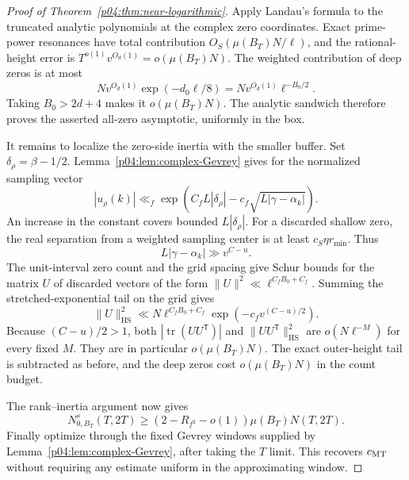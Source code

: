 \documentclass[11pt,letterpaper]{article}
\theoremstyle{definition}
\theoremstyle{remark}
\DeclareMathOperator{\tr}{tr}
\newcommand{\1}{\mathbf 1}
\begin{document}
\begin{proof}[Proof of Theorem~\ref{p04:thm:near-logarithmic}]
Apply Landau's formula to the truncated analytic polynomials at
the complex zero coordinates. Exact prime-power resonances have
total contribution $O_S(\mu(B_T)N/\ell)$, and the rational-height
error is $T^{o(1)}v^{O_d(1)}=o(\mu(B_T)N)$. The weighted
contribution of deep zeros is at most
\[
 Nv^{O_d(1)}\exp(-d_0\ell/8)
       =Nv^{O_d(1)}\ell^{-B_0/2}.
\]
Taking $B_0>2d+4$ makes it $o(\mu(B_T)N)$. The analytic
sandwich therefore proves the asserted all-zero asymptotic,
uniformly in the box.

It remains to localize the zero-side inertia with the smaller
buffer. Set $\delta_\rho=\beta-1/2$. Lemma~\ref{p04:lem:complex-Gevrey}
gives for the normalized sampling vector
\[
 |u_\rho(k)|\ll_f
 \exp\left(C_fL|\delta_\rho|
                    -c_f\sqrt{L|\gamma-\alpha_k|}\right).
\]
An increase in the constant covers bounded $L|\delta_\rho|$.
For a discarded shallow zero, the real separation from a weighted
sampling center is at least
$c_S\eta r_{\min}$. Thus
\[
 L|\gamma-\alpha_k|\gg v^{C-u}.
\]
The unit-interval zero count and the grid spacing give Schur bounds
for the matrix $U$ of discarded vectors of the form
$\|U\|^2\ll\ell^{C_fB_0+C_f}$. Summing the stretched-exponential
tail on the grid gives
\[
 \|U\|_{\mathrm{HS}}^2
 \ll N\ell^{C_fB_0+C_f}
                    \exp(-c_f v^{(C-u)/2}).
\]
Because $(C-u)/2>1$, both
$|\tr(UU^{\mathsf T})|$ and
$\|UU^{\mathsf T}\|_{\mathrm{HS}}^2$
are $o(N\ell^{-M})$ for every fixed $M$. They are in particular
$o(\mu(B_T)N)$. The exact outer-height tail is subtracted as
before, and the deep zeros cost $o(\mu(B_T)N)$ in the count budget.

The rank--inertia argument now gives
\[
 N^s_{0,B_T}(T,2T)
       \ge(2-R_{f^2}-o(1))\mu(B_T)N(T,2T).
\]
Finally optimize through the fixed Gevrey windows supplied by
Lemma~\ref{p04:lem:complex-Gevrey}, after taking the $T$ limit. This
recovers $c_{\rm MT}$ without requiring any estimate uniform in
the approximating window.
\end{proof}
\end{document}
